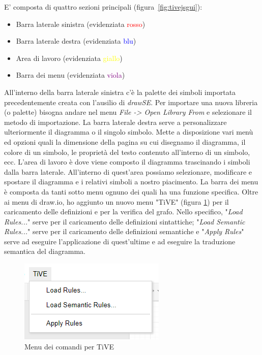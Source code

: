             E' composta di quattro sezioni principali (figura~\ref{fig:tivejsgui}):
            \begin{itemize}
                \item Barra laterale sinistra (evidenziata \textcolor{red}{rosso})
                \item Barra laterale destra (evidenziata \textcolor{blue}{blu})
                \item Area di lavoro (evidenziata \textcolor{yellow}{giallo})
                \item Barra dei menu (evidenziata \textcolor{purple}{viola})
            \end{itemize}
            All'interno della barra laterale sinistra c'è la palette dei simboli importata precedentemente creata con l'ausilio di \textit{drawSE}. Per importare una nuova libreria (o palette) bisogna andare nel menu \textit{File -> Open Library From} e selezionare il metodo di importazione.
            \newline
            La barra laterale destra serve a personalizzare ulteriormente il diagramma o il singolo simbolo. Mette a disposizione vari menù ed opzioni quali la dimensione della pagina su cui disegnamo il diagramma, il colore di un simbolo, le proprietà del testo contenuto all'interno di un simbolo, ecc. 
            \newline
            L'area di lavoro è dove viene composto il diagramma trascinando i simboli dalla barra laterale. All'interno di quest'area possiamo selezionare, modificare e spostare il diagramma e i relativi simboli a nostro piacimento.
            \newline
            La barra dei menu è composta da tanti sotto menu ognuno dei quali ha una funzione specifica. Oltre ai menu di draw.io, ho aggiunto un nuovo menu "TiVE" (figura \ref{fig:tivemenu}) per il caricamento delle definizioni e per la verifica del grafo. Nello specifico, "\textit{Load Rules...}" serve per il caricamento delle definizioni sintattiche; "\textit{Load Semantic Rules...}" serve per il caricamento delle definizioni semantiche e "\textit{Apply Rules}" serve ad eseguire l'applicazione di quest'ultime e ad eseguire la traduzione semantica del diagramma.
            
            \begin{figure}[htbp]
                \centering
                \includegraphics[]{Figure/tive_menu.PNG}
                \caption{Menu dei comandi per TiVE}
                \label{fig:tivemenu}
            \end{figure}

